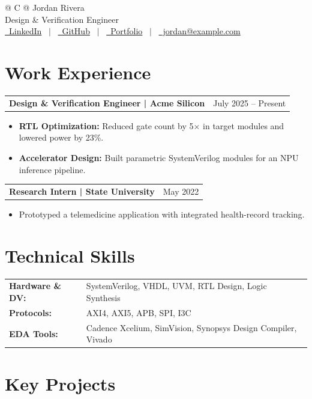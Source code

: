\documentclass[a4paper,12pt]{article}
\makeatletter
\newenvironment{joblong}[2]
  {\begin{tabularx}{\linewidth}{@{} X r @{}}\textbf{#1} & #2 \\\end{tabularx}
   \begin{itemize}[nosep, leftmargin=1em, label=--]}
  {\end{itemize}}
\makeatother
\begin{document}
\begin{tabularx}{\linewidth}{@{} C @{}}
\Huge{Jordan Rivera} \\[4pt]
\small{Design \& Verification Engineer} \\[6pt]
\href{https://linkedin.com/in/jordanrivera}{\faLinkedin\ LinkedIn} \ $|$ \
\href{https://github.com/jordanrivera}{\faGithub\ GitHub} \ $|$ \
\href{https://jordanrivera.example.com/}{\faGlobe\ Portfolio} \ $|$ \
\href{mailto:jordan@example.com}{\faEnvelope\ jordan@example.com} \\
\end{tabularx}

\section{Work Experience}

\begin{joblong}{Design \& Verification Engineer | Acme Silicon}{July 2025 -- Present}
    \item \textbf{RTL Optimization:} Reduced gate count by 5$\times$ in target modules and lowered power by 23\%.
    \item \textbf{Accelerator Design:} Built parametric SystemVerilog modules for an NPU inference pipeline.
\end{joblong}

\begin{joblong}{Research Intern | State University}{May 2022}
    \item Prototyped a telemedicine application with integrated health-record tracking.
\end{joblong}

\section{Technical Skills}
\begin{tabularx}{\linewidth}{@{}l X@{}}
\textbf{Hardware \& DV:} & SystemVerilog, VHDL, UVM, RTL Design, Logic Synthesis \\
\textbf{Protocols:}      & AXI4, AXI5, APB, SPI, I3C \\
\textbf{EDA Tools:}      & Cadence Xcelium, SimVision, Synopsys Design Compiler, Vivado \\
\end{tabularx}

\section{Key Projects}
\end{document}
